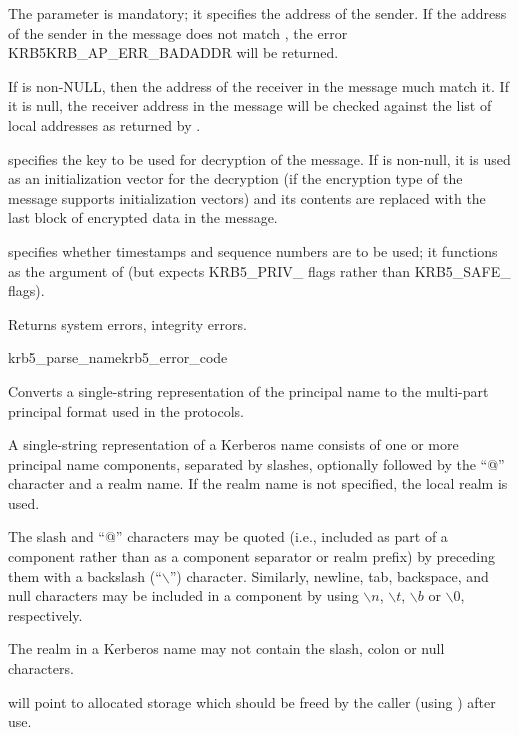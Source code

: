 The  parameter is mandatory;  it
specifies the address of the sender.  If the address of the sender in
the message does not match , the error
KRB5KRB_AP_ERR_BADADDR will be returned.

If  is non-NULL, then the address of the receiver
in the message much match it.  If it is null, the receiver address in
the message will be checked against the list of local addresses as
returned by .

 specifies the key to be used for decryption of the
message.  If  is non-null, it is used as an
initialization vector for the decryption (if the encryption type of
the message supports initialization vectors) and its contents are
replaced with the last block of encrypted data in the message.

 specifies whether timestamps and sequence
numbers are to be used; it functions as the 
argument of  (but expects KRB5_PRIV_ flags
rather than KRB5_SAFE_ flags).

Returns system errors, integrity errors.

\begin{funcdecl}{krb5_parse_name}{krb5_error_code}{\funcin}
\funcout
{}
\end{funcdecl}

Converts a single-string representation  of the
principal name to the multi-part principal format used in the protocols.

A single-string representation of a Kerberos name consists of one or
more principal name components, separated by slashes, optionally
followed by the ``@'' character and a realm name.  If the realm name
is not specified, the local realm is used.

The slash and ``@'' characters may be quoted (i.e., included as part
of a component rather than as a component separator or realm prefix)
by preceding them with a backslash (``$\backslash$'') character.
Similarly, newline, tab, backspace, and null characters may be
included in a component by using $\backslash{}n$, $\backslash{}t$,
$\backslash{}b$ or $\backslash{}0$, respectively.

The realm in a Kerberos name may not contain the slash, colon or null
characters.

 will point to allocated storage which should be freed by
the caller (using ) after use.

